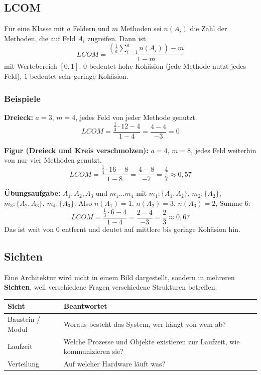 \documentclass[12pt, a4paper]{article}
\begin{document}
\subsection{LCOM}
\label{sec:lcom}

\begin{definitionbox}
Für eine Klasse mit $a$ Feldern und $m$ Methoden sei $n(A_i)$ die Zahl der Methoden,
die auf Feld $A_i$ zugreifen. Dann ist
\[
LCOM = \frac{\left(\frac{1}{a}\sum_{i=1}^{a} n(A_i)\right) - m}{1 - m}
\]
mit Wertebereich $[0,1]$. $0$ bedeutet hohe Kohäsion (jede Methode nutzt jedes Feld),
$1$ bedeutet sehr geringe Kohäsion.
\end{definitionbox}

\subsubsection*{Beispiele}

\textbf{Dreieck:} $a=3$, $m=4$, jedes Feld von jeder Methode genutzt.
\[
LCOM = \frac{\frac{1}{3}\cdot 12 - 4}{1-4} = \frac{4-4}{-3} = 0
\]

\textbf{Figur (Dreieck und Kreis verschmolzen):} $a=4$, $m=8$, jedes Feld weiterhin von
nur vier Methoden genutzt.
\[
LCOM = \frac{\frac{1}{4}\cdot 16 - 8}{1-8} = \frac{4-8}{-7} = \frac{4}{7} \approx 0{,}57
\]

\textbf{Übungsaufgabe:} $A_1, A_2, A_3$ und $m_1 \dots m_4$ mit
$m_1: \{A_1, A_2\}$, $m_2: \{A_2\}$, $m_3: \{A_2, A_3\}$, $m_4: \{A_3\}$.
Also $n(A_1) = 1$, $n(A_2) = 3$, $n(A_3) = 2$, Summe $6$:
\[
LCOM = \frac{\frac{1}{3}\cdot 6 - 4}{1-4} = \frac{2-4}{-3} = \frac{2}{3} \approx 0{,}67
\]
Das ist weit von $0$ entfernt und deutet auf mittlere bis geringe Kohäsion hin.

\subsection{Sichten}

Eine Architektur wird nicht in einem Bild dargestellt, sondern in mehreren
\textbf{Sichten}, weil verschiedene Fragen verschiedene Strukturen betreffen:

\begin{center}
\begin{tabular}{lp{8.2cm}}
\hline
\textbf{Sicht} & \textbf{Beantwortet} \\
\hline
Baustein / Modul & Woraus besteht das System, wer hängt von wem ab? \\
Laufzeit         & Welche Prozesse und Objekte existieren zur Laufzeit, wie kommunizieren sie? \\
Verteilung       & Auf welcher Hardware läuft was? \\
\hline
\end{tabular}
\end{center}
\end{document}

